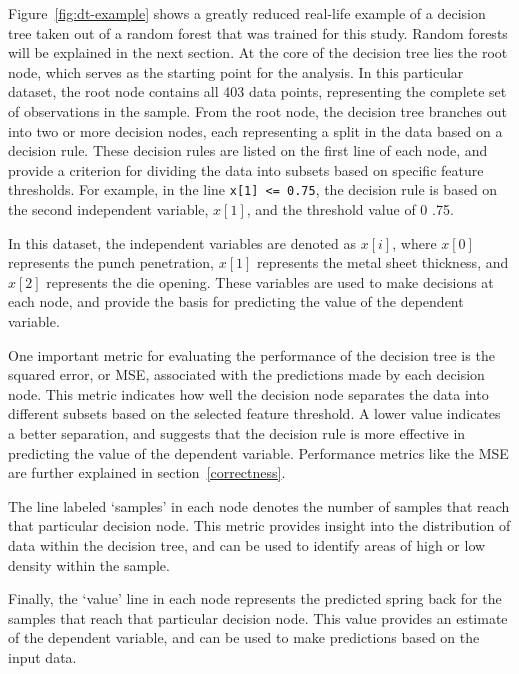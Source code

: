 Figure~\ref{fig:dt-example} shows a greatly reduced real-life example of a decision tree taken out of a random forest
that was trained for this study. Random forests will be explained in the next section.
At the core of the decision tree lies the root node, which serves as the starting point for the analysis.
In this particular dataset, the root node contains all 403 data points, representing the complete set of observations
in the sample.
From the root node, the decision tree branches out into two or more decision nodes, each representing a split in the
data based on a decision rule.
These decision rules are listed on the first line of each node, and provide a criterion for dividing the data into
subsets based on specific feature thresholds.
For example, in the line \texttt{x[1] <= 0.75}, the decision rule is based on the second independent variable,
$x[1]$, and the threshold value of 0 .75.

In this dataset, the independent variables are denoted as $x[i]$, where $x[0]$ represents the punch penetration,
$x[1]$ represents the metal sheet thickness, and $x[2]$ represents the die opening. These variables are used to make
decisions at each node, and provide the basis for predicting the value of the dependent variable.

One important metric for evaluating the performance of the decision tree is the squared error, or \ac{MSE},
associated with the predictions made by each decision node.
This metric indicates how well the decision node separates the data into different subsets based on the selected
feature threshold.
A lower value indicates a better separation, and suggests that the decision rule is more effective in predicting the
value of the dependent variable.
Performance metrics like the \ac{MSE} are further explained in section~\ref{correctness}.

The line labeled `samples' in each node denotes the number of samples that reach that particular decision node.
This metric provides insight into the distribution of data within the decision tree, and can be used to identify
areas of high or low density within the sample.

Finally, the `value' line in each node represents the predicted spring back for the samples that reach that
particular decision node.
This value provides an estimate of the dependent variable, and can be used to make predictions based on the input data.

